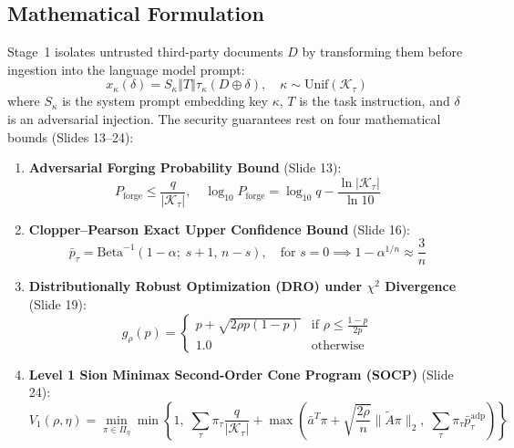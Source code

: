 \documentclass[10pt,a4paper]{article}
\begin{document}
\subsection{Mathematical Formulation}
Stage~1 isolates untrusted third-party documents $D$ by transforming them before ingestion into the language model prompt:
\begin{equation}
x_\kappa(\delta) = S_\kappa \mathbin{\Vert} T \mathbin{\Vert} \tau_\kappa(D \oplus \delta), \quad \kappa \sim \mathrm{Unif}(\mathcal{K}_\tau)
\end{equation}
where $S_\kappa$ is the system prompt embedding key $\kappa$, $T$ is the task instruction, and $\delta$ is an adversarial injection.
The security guarantees rest on four mathematical bounds (Slides 13--24):
\begin{enumerate}
    \item \textbf{Adversarial Forging Probability Bound} (Slide 13):
    \begin{equation}
    P_{\mathrm{forge}} \le \frac{q}{|\mathcal{K}_\tau|}, \quad \log_{10} P_{\mathrm{forge}} = \log_{10} q - \frac{\ln |\mathcal{K}_\tau|}{\ln 10}
    \end{equation}
    \item \textbf{Clopper--Pearson Exact Upper Confidence Bound} (Slide 16):
    \begin{equation}
    \bar{p}_\tau = \mathrm{Beta}^{-1}(1-\alpha;\; s+1,\, n-s), \quad \text{for } s=0 \implies 1 - \alpha^{1/n} \approx \frac{3}{n}
    \end{equation}
    \item \textbf{Distributionally Robust Optimization (DRO) under $\chi^2$ Divergence} (Slide 19):
    \begin{equation}
    g_\rho(p) = \begin{cases} 
    p + \sqrt{2\rho p(1-p)} & \text{if } \rho \le \frac{1-p}{2p} \\ 
    1.0 & \text{otherwise} 
    \end{cases}
    \end{equation}
    \item \textbf{Level 1 Sion Minimax Second-Order Cone Program (SOCP)} (Slide 24):
    \begin{equation}
    V_1(\rho, \eta) = \min_{\pi \in \Pi_\eta} \min\left\{1,\; \sum_\tau \pi_\tau \frac{q}{|\mathcal{K}_\tau|} + \max\left( \bar{a}^T\pi + \sqrt{\frac{2\rho}{n}}\|\tilde{A}\pi\|_2,\; \sum_\tau \pi_\tau \bar{p}^{\mathrm{adp}}_\tau \right) \right\}
    \end{equation}
\end{enumerate}
\end{document}
